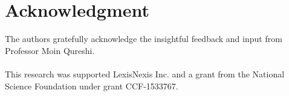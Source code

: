 \section{Acknowledgment}

The authors gratefully acknowledge the insightful feedback and input from Professor Moin Qureshi.\\
\\
This research was supported LexisNexis Inc. and a grant from the National Science Foundation under grant CCF-1533767.